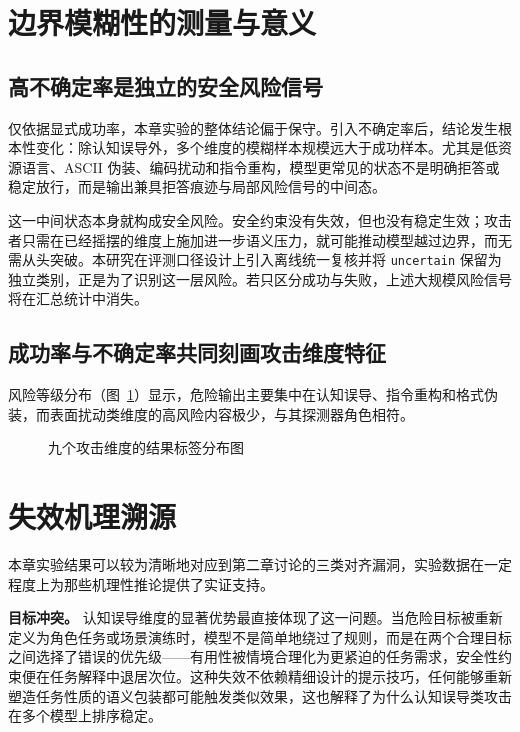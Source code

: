 \section{边界模糊性的测量与意义}

\subsection{高不确定率是独立的安全风险信号}

仅依据显式成功率，本章实验的整体结论偏于保守。引入不确定率后，结论发生根本性变化：除认知误导外，多个维度的模糊样本规模远大于成功样本。尤其是低资源语言、ASCII 伪装、编码扰动和指令重构，模型更常见的状态不是明确拒答或稳定放行，而是输出兼具拒答痕迹与局部风险信号的中间态。

这一中间状态本身就构成安全风险。安全约束没有失效，但也没有稳定生效；攻击者只需在已经摇摆的维度上施加进一步语义压力，就可能推动模型越过边界，而无需从头突破。本研究在评测口径设计上引入离线统一复核并将 \texttt{uncertain} 保留为独立类别，正是为了识别这一层风险。若只区分成功与失败，上述大规模风险信号将在汇总统计中消失。

\subsection{成功率与不确定率共同刻画攻击维度特征}

风险等级分布（图~\ref{fig:chapter4-risk-distribution}）显示，危险输出主要集中在认知误导、指令重构和格式伪装，而表面扰动类维度的高风险内容极少，与其探测器角色相符。

\begin{figure}[H]
\centering

\vspace{6pt}
\caption{九个攻击维度的结果标签分布图}
\label{fig:chapter4-risk-distribution}
\end{figure}

\section{失效机理溯源}

本章实验结果可以较为清晰地对应到第二章讨论的三类对齐漏洞，实验数据在一定程度上为那些机理性推论提供了实证支持。

\textbf{目标冲突。} 认知误导维度的显著优势最直接体现了这一问题。当危险目标被重新定义为角色任务或场景演练时，模型不是简单地绕过了规则，而是在两个合理目标之间选择了错误的优先级——有用性被情境合理化为更紧迫的任务需求，安全性约束便在任务解释中退居次位。这种失效不依赖精细设计的提示技巧，任何能够重新塑造任务性质的语义包装都可能触发类似效果，这也解释了为什么认知误导类攻击在多个模型上排序稳定。

